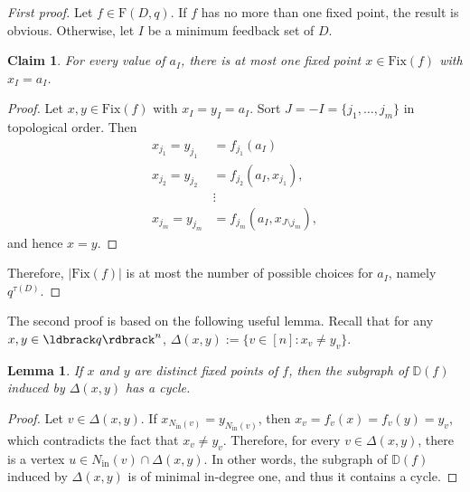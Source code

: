 \documentclass[a4paper, 11pt]{book}
\numberwithin{equation}{section}
\theoremstyle{plain}
\newtheorem{lemma}		[equation]	{Lemma}
\newtheorem{claim}		[equation]	{Claim}
\newcommand{\neighbourhood}{N}
\newcommand{\inn}[1]{#1_\mathrm{in}}
\newcommand{\NIn}{\inn{\neighbourhood}}
\newcommand{\feedback}{\tau}
\newcommand{\IG}{\mathbb{D}}
\newcommand{\functions}{\mathrm{F}}
\newcommand{\Fix}{\mathrm{Fix}}
\renewcommand{\(}{\ldbrack}
\renewcommand{\)}{\rdbrack}
\begin{document}
\begin{proof}[First proof]
Let $f \in \functions(D,q)$. If $f$ has no more than one fixed point, the result is obvious. Otherwise, let $I$ be a minimum feedback set of $D$.

\begin{claim}
For every value of $a_I$, there is at most one fixed point $x \in \Fix(f)$ with $x_I = a_I$.
\end{claim}

\begin{proof}
Let $x, y \in \Fix(f)$ with $x_I = y_I = a_I$. Sort $J = - I = \{j_1, \dots, j_m \}$ in topological order. Then 
\begin{align*}
	x_{j_1} = y_{j_1} &= f_{j_1}(a_I)\\
	x_{j_2} = y_{j_2} &= f_{j_2}(a_I, x_{j_1}),\\
	&\vdots\\
	x_{j_m} = y_{j_m} &= f_{j_m} (a_I, x_{J \setminus j_m}),
\end{align*}
and hence $x = y$.
\end{proof}

Therefore, $|\Fix(f)|$ is at most the number of possible choices for $a_I$, namely $q^{\feedback(D)}$.
\end{proof}

The second proof is based on the following useful lemma. Recall that for any $x,y\in \(q\)^n$, $\Delta(x,y):=\{v \in [n] : x_v \ne y_v\}$.

\begin{lemma}\label{lem:cycle_x_y}
If $x$ and $y$ are distinct fixed points of $f$, then the subgraph of $\IG(f)$ induced by $\Delta(x,y)$ has a cycle. 
\end{lemma}

\begin{proof}
Let $v \in \Delta(x,y)$. If $x_{\NIn(v)} = y_{\NIn(v)}$, then $x_v = f_v(x) = f_v(y) = y_v$, which contradicts the fact that $x_v \ne y_v$. Therefore, for every $v \in \Delta(x,y)$, there is a vertex $u \in \NIn(v) \cap \Delta(x,y)$. In other words, the subgraph of $\IG(f)$ induced by $\Delta(x,y)$ is of minimal in-degree one, and thus it contains a cycle. 
\end{proof}
\end{document}
